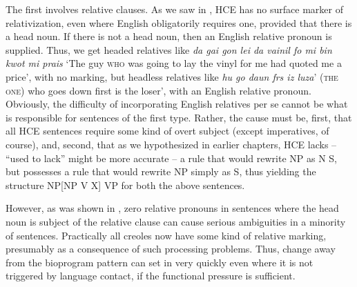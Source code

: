 The first involves relative clauses. As we saw in , HCE has no surface marker of relativization, even where English obligatorily requires one, provided that there is a head noun. If there is not a head noun, then an English relative pronoun is supplied. Thus, we get headed relatives like \textit{da gai gon lei da vainil fo mi bin kwot mi prais} `The guy \textsc{who} was going to lay the vinyl for me had quoted me a price', with no marking, but headless relatives like \textit{hu go daun frs iz luza}' (\textsc{the one}) who goes down first is the loser', with an English relative pro\-noun. Obviously, the difficulty of incorporating English relatives per se cannot be what is responsible for sentences of the first type. Rather, the cause must be, first, that all HCE sentences require some kind of overt subject (except imperatives, of course), and, second, that as we hypothesized in earlier chapters, HCE lacks -- ``used to lack'' might be more accurate -- a rule that would rewrite NP as N S, but possesses a rule that would rewrite NP simply as S, thus yielding the structure NP[NP V X] VP for both the above sentences.

However, as was shown in \citet{BeverEtAl1971}, zero relative pronouns in sentences where the head noun is subject of the relative clause can cause serious ambiguities in a minority of sentences. Practically all creoles now have some kind of relative marking, pre\-sumably as a consequence of such processing problems. Thus, change away from the bioprogram pattern can set in very quickly even where it is not triggered by language contact, if the functional pressure is sufficient.

